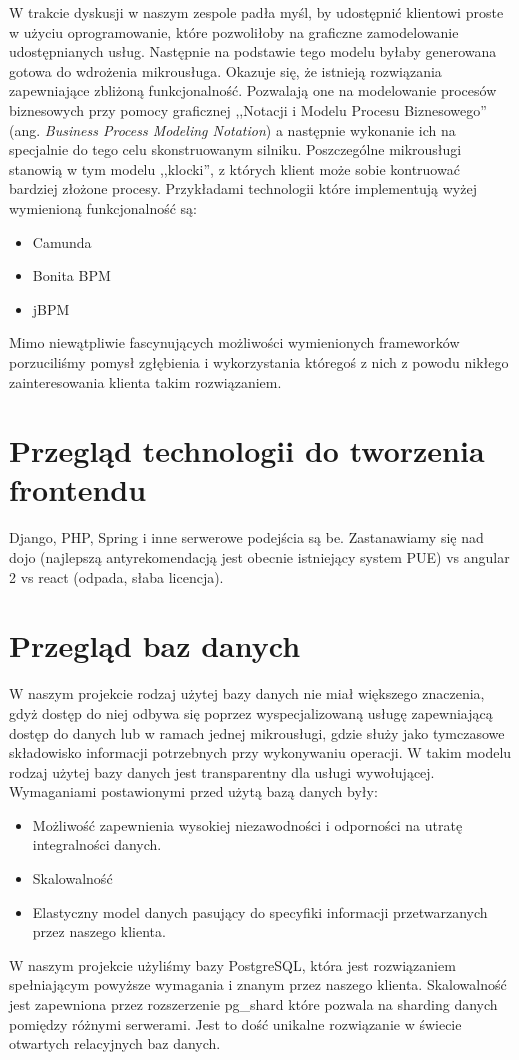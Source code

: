 \documentclass[licencjacka]{pracamgr}
\begin{document}
W trakcie dyskusji w naszym zespole padła myśl, by udostępnić klientowi proste w użyciu oprogramowanie, które pozwoliłoby na graficzne zamodelowanie udostępnianych usług. Następnie na podstawie tego modelu byłaby generowana gotowa do wdrożenia mikrousługa. Okazuje się, że istnieją rozwiązania zapewniające zbliżoną funkcjonalność. Pozwalają one na modelowanie procesów biznesowych przy pomocy graficznej ,,Notacji i Modelu Procesu Biznesowego'' (ang. \textit{Business Process Modeling Notation}) a następnie wykonanie ich na specjalnie do tego celu skonstruowanym silniku. Poszczególne mikrousługi stanowią w tym modelu ,,klocki'', z których klient może sobie kontruować bardziej złożone procesy. Przykładami technologii które implementują wyżej wymienioną funkcjonalność są:
\begin{itemize}
	\item Camunda
	\item Bonita BPM
	\item jBPM
\end{itemize}
Mimo niewątpliwie fascynujących możliwości wymienionych frameworków porzuciliśmy pomysł zgłębienia i wykorzystania któregoś z nich z powodu nikłego zainteresowania klienta takim rozwiązaniem.

\section{Przegląd technologii do tworzenia frontendu}
Django, PHP, Spring i inne serwerowe podejścia są be. Zastanawiamy się nad dojo (najlepszą antyrekomendacją jest obecnie istniejący system PUE) vs angular 2 vs react (odpada, słaba licencja). %

\section{Przegląd baz danych}

W naszym projekcie rodzaj użytej bazy danych nie miał większego znaczenia, gdyż dostęp do niej odbywa się poprzez
wyspecjalizowaną usługę zapewniającą dostęp do danych lub w ramach jednej mikrousługi, gdzie służy jako tymczasowe
składowisko informacji potrzebnych przy wykonywaniu operacji. W takim modelu rodzaj użytej bazy danych jest
transparentny dla usługi wywołującej.
Wymaganiami postawionymi przed użytą bazą danych były:
\begin{itemize}
\item Możliwość zapewnienia wysokiej niezawodności i odporności na utratę integralności danych.
\item Skalowalność
\item Elastyczny model danych pasujący do specyfiki informacji przetwarzanych przez naszego klienta.
\end{itemize}
W naszym projekcie użyliśmy bazy PostgreSQL, która jest rozwiązaniem spełniającym powyższe wymagania i znanym przez naszego klienta. Skalowalność jest zapewniona przez rozszerzenie pg\_shard które pozwala na sharding danych pomiędzy różnymi serwerami. Jest to dość unikalne rozwiązanie w świecie otwartych relacyjnych baz danych.
\end{document}
